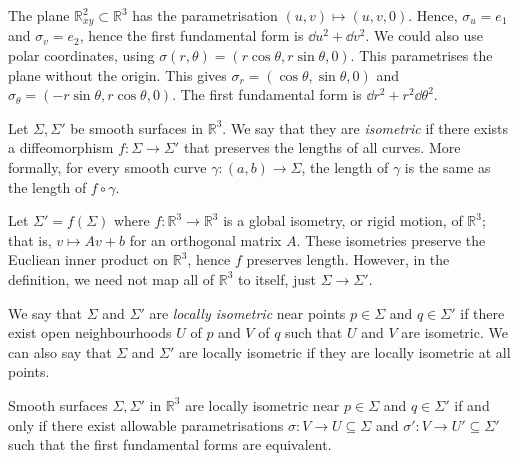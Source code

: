 \begin{example}
	The plane \( \mathbb R^2_{xy} \subset \mathbb R^3 \) has the parametrisation \( (u,v) \mapsto (u,v,0) \).
	Hence, \( \sigma_u = e_1 \) and \( \sigma_v = e_2 \), hence the first fundamental form is \( \dd{u}^2 + \dd{v}^2 \).
	We could also use polar coordinates, using \( \sigma(r,\theta) = (r\cos\theta,r\sin\theta,0) \).
	This parametrises the plane without the origin.
	This gives \( \sigma_r = (\cos\theta,\sin\theta,0) \) and \( \sigma_\theta = (-r\sin\theta, r\cos\theta,0) \).
	The first fundamental form is \( \dd{r}^2 + r^2 \dd{\theta}^2 \).
\end{example}
\begin{definition}
	Let \( \Sigma, \Sigma' \) be smooth surfaces in \( \mathbb R^3 \).
	We say that they are \textit{isometric} if there exists a diffeomorphism \( f\colon \Sigma \to \Sigma' \) that preserves the lengths of all curves.
	More formally, for every smooth curve \( \gamma \colon (a,b) \to \Sigma \), the length of \( \gamma \) is the same as the length of \( f \circ \gamma \).
\end{definition}
\begin{example}
	Let \( \Sigma' = f(\Sigma) \) where \( f \colon \mathbb R^3 \to \mathbb R^3 \) is a global isometry, or rigid motion, of \( \mathbb R^3 \); that is, \( v \mapsto Av+b \) for an orthogonal matrix \( A \).
	These isometries preserve the Eucliean inner product on \( \mathbb R^3 \), hence \( f \) preserves length.
	However, in the definition, we need not map all of \( \mathbb R^3 \) to itself, just \( \Sigma \to \Sigma' \).
\end{example}
\begin{definition}
	We say that \( \Sigma \) and \( \Sigma' \) are \textit{locally isometric} near points \( p \in \Sigma \) and \( q \in \Sigma' \) if there exist open neighbourhoods \( U \) of \( p \) and \( V \) of \( q \) such that \( U \) and \( V \) are isometric.
	We can also say that \( \Sigma \) and \( \Sigma' \) are locally isometric if they are locally isometric at all points.
\end{definition}
\begin{lemma}
	Smooth surfaces \( \Sigma, \Sigma' \) in \( \mathbb R^3 \) are locally isometric near \( p \in \Sigma \) and \( q \in \Sigma' \) if and only if there exist allowable parametrisations \( \sigma \colon V \to U \subseteq \Sigma \) and \( \sigma' \colon V \to U' \subseteq \Sigma' \) such that the first fundamental forms are equivalent.
\end{lemma}
